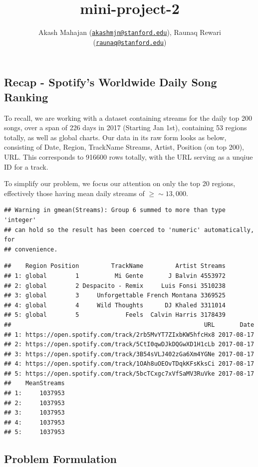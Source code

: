 \documentclass[]{article}
\title{mini-project-2}
\author{Akash Mahajan
(\href{mailto:akashmjn@stanford.edu}{\nolinkurl{akashmjn@stanford.edu}}),
Raunaq Rewari
(\href{mailto:raunaq@stanford.edu}{\nolinkurl{raunaq@stanford.edu}})}
\date{}
\begin{document}
\maketitle

\subsection{Recap - Spotify's Worldwide Daily Song
Ranking}\label{recap---spotifys-worldwide-daily-song-ranking}

To recall, we are working with a dataset containing streams for the
daily top 200 songs, over a span of 226 days in 2017 (Starting Jan 1st),
containing 53 regions totally, as well as global charts. Our data in its
raw form looks as below, consisting of Date, Region, TrackName Streams,
Artist, Position (on top 200), URL. This corresponds to 916600 rows
totally, with the URL serving as a unqiue ID for a track.

To simplify our problem, we focus our attention on only the top 20
regions, effectively those having mean daily streams of
\(\geq\sim 13,000\).

\begin{verbatim}
## Warning in gmean(Streams): Group 6 summed to more than type 'integer'
## can hold so the result has been coerced to 'numeric' automatically, for
## convenience.
\end{verbatim}

\begin{verbatim}
##    Region Position         TrackName         Artist Streams
## 1: global        1          Mi Gente       J Balvin 4553972
## 2: global        2 Despacito - Remix     Luis Fonsi 3510238
## 3: global        3     Unforgettable French Montana 3369525
## 4: global        4     Wild Thoughts      DJ Khaled 3311014
## 5: global        5             Feels  Calvin Harris 3178439
##                                                      URL       Date
## 1: https://open.spotify.com/track/2rb5MvYT7ZIxbKW5hfcHx8 2017-08-17
## 2: https://open.spotify.com/track/5CtI0qwDJkDQGwXD1H1cLb 2017-08-17
## 3: https://open.spotify.com/track/3B54sVLJ402zGa6Xm4YGNe 2017-08-17
## 4: https://open.spotify.com/track/1OAh8uOEOvTDqkKFsKksCi 2017-08-17
## 5: https://open.spotify.com/track/5bcTCxgc7xVfSaMV3RuVke 2017-08-17
##    MeanStreams
## 1:     1037953
## 2:     1037953
## 3:     1037953
## 4:     1037953
## 5:     1037953
\end{verbatim}

\subsection{Problem Formulation}\label{problem-formulation}
\end{document}
